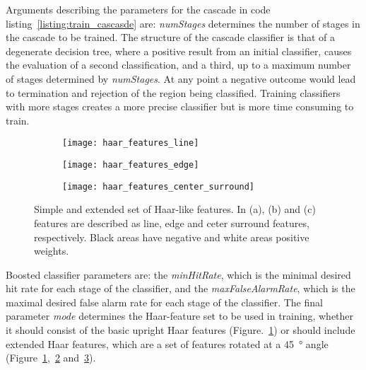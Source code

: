Arguments describing the parameters for the cascade in code listing~\ref{listing:train_cascasde} are: \emph{numStages} determines the number of stages in the cascade to be trained. The structure of the cascade classifier is that of a degenerate decision tree, where a positive result from an initial classifier, causes the evaluation of a second classification, and a third, up to a maximum number of stages determined by \emph{numStages}. At any point a negative outcome would lead to termination and rejection of the region being classified. Training classifiers with more stages creates a more precise classifier but is more time consuming to train.

\begin{figure}[htbp!]
	\begin{subfigure}[b]{\linewidth}
		\centering
		\texttt{[image: haar\_features\_line]}
		\caption{}
		\label{figure:haar_features:line}
	\end{subfigure}
	\begin{subfigure}[b]{\linewidth}
		\centering
		\texttt{[image: haar\_features\_edge]}
		\caption{}
		\label{figure:haar_features:edge}
	\end{subfigure}
	\begin{subfigure}[b]{\linewidth}
		\centering
		\texttt{[image: haar\_features\_center\_surround]}
		\caption{}
		\label{figure:haar_features:center_surround}
	\end{subfigure}
	\caption[Extended Haar features]{Simple and extended set of Haar-like features. In (a), (b) and (c) features are described as line, edge and ceter surround features, respectively. Black areas have negative and white areas positive weights.}
	\label{figure:haar_features}
\end{figure}

Boosted classifier parameters are: the \emph{minHitRate}, which is the minimal desired hit rate for each stage of the classifier, and the \emph{maxFalseAlarmRate}, which is the maximal desired false alarm rate for each stage of the classifier. The final parameter \emph{mode} determines the Haar-feature set to be used in training, whether it should consist of the basic upright Haar features (Figure.~\ref{figure:haar_features:line}) or should include extended Haar features, which are a set of features rotated at a \SI{45}{\degree} angle~\cite{Lienhart2002} (Figure~\ref{figure:haar_features:line},~\ref{figure:haar_features:edge} and~\ref{figure:haar_features:center_surround}).

